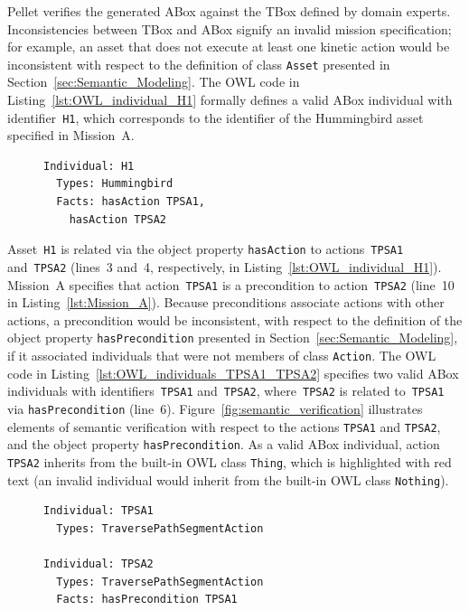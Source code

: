 Pellet verifies the generated ABox against the TBox defined by domain experts. Inconsistencies between TBox and ABox signify an invalid mission specification; for example, an asset that does not execute at least one kinetic action would be inconsistent with respect to the definition of class \texttt{Asset} presented in Section~\ref{sec:Semantic_Modeling}. The OWL code in Listing~\ref{lst:OWL_individual_H1} formally defines a valid ABox individual with identifier~\texttt{H1}, which corresponds to the identifier of the Hummingbird asset specified in Mission~A.

\begin{figure}[ht]
\begin{lstlisting}[caption={OWL code for the individual \texttt{H1}},label=lst:OWL_individual_H1]
Individual: H1
  Types: Hummingbird
  Facts: hasAction TPSA1,
    hasAction TPSA2
\end{lstlisting}
\end{figure}

Asset~\texttt{H1} is related via the object property \texttt{hasAction} to actions~\texttt{TPSA1} and~\texttt{TPSA2} (lines~3 and~4, respectively, in Listing~\ref{lst:OWL_individual_H1}). Mission~A specifies that action~\texttt{TPSA1} is a precondition to action~\texttt{TPSA2} (line~10 in Listing~\ref{lst:Mission_A}). Because preconditions associate actions with other actions, a precondition would be inconsistent, with respect to the definition of the object property \texttt{hasPrecondition} presented in Section~\ref{sec:Semantic_Modeling}, if it associated individuals that were not members of class \texttt{Action}. The OWL code in Listing~\ref{lst:OWL_individuals_TPSA1_TPSA2} specifies two valid ABox individuals with identifiers~\texttt{TPSA1} and~\texttt{TPSA2}, where~\texttt{TPSA2} is related to~\texttt{TPSA1} via \texttt{hasPrecondition} (line~6). Figure~\ref{fig:semantic_verification} illustrates elements of semantic verification with respect to the actions \texttt{TPSA1} and \texttt{TPSA2}, and the object property \texttt{hasPrecondition}. As a valid ABox individual, action \texttt{TPSA2} inherits from the built-in OWL class \texttt{Thing}, which is highlighted with red text (an invalid individual would inherit from the built-in OWL class \texttt{Nothing}).

\begin{figure}[ht]
\begin{lstlisting}[caption={OWL code for the individuals \texttt{TPSA1} and \texttt{TPSA2}},label=lst:OWL_individuals_TPSA1_TPSA2]
Individual: TPSA1
  Types: TraversePathSegmentAction

Individual: TPSA2
  Types: TraversePathSegmentAction
  Facts: hasPrecondition TPSA1
\end{lstlisting}
\end{figure}

